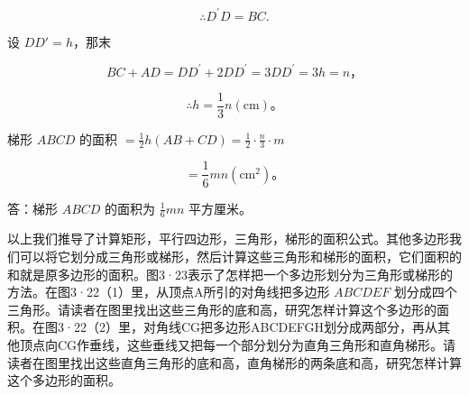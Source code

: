 \[
\therefore D ^ {\prime} D = B C.
\]

设 \(DD' = h\)，那末

\[
B C + A D = D D ^ {\prime} + 2 D D ^ {\prime} = 3 D D ^ {\prime} = 3 h = n\text{，}
\]

\[
\therefore h = \frac {1}{3} n (\mathrm{cm})\text{。}
\]

梯形 \(ABCD\) 的面积
\(= \frac{1}{2} h(AB + CD) = \frac{1}{2} \cdot \frac{n}{3} \cdot m\)

\[
= \frac {1}{6} m n (\mathrm{cm} ^ {2})\text{。}
\]

答：梯形 \(ABCD\) 的面积为 \(\frac{1}{6} mn\) 平方厘米。

以上我们推导了计算矩形，平行四边形，三角形，梯形的面积公式。其他多边形我们可以将它划分成三角形或梯形，然后计算这些三角形和梯形的面积，它们面积的和就是原多边形的面积。图3·23表示了怎样把一个多边形划分为三角形或梯形的方法。在图3·22（1）里，从顶点A所引的对角线把多边形
\(ABCDEF\)
划分成四个三角形。请读者在图里找出这些三角形的底和高，研究怎样计算这个多边形的面积。在图3·22（2）里，对角线CG把多边形ABCDEFGH划分成两部分，再从其他顶点向CG作垂线，这些垂线又把每一个部分划分为直角三角形和直角梯形。请读者在图里找出这些直角三角形的底和高，直角梯形的两条底和高，研究怎样计算这个多边形的面积。

